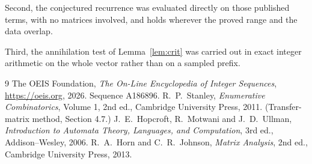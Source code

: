 \documentclass[11pt,a4paper]{article}
\theoremstyle{plain}
\theoremstyle{definition}
\begin{document}
Second, the conjectured recurrence was evaluated directly on those published terms, with no
matrices involved, and holds wherever the proved range and the data overlap.

Third, the annihilation test of Lemma~\ref{lem:crit} was carried out in exact integer
arithmetic on the whole vector rather than on a sampled prefix.

\begin{thebibliography}{9}
 The OEIS Foundation, \emph{The On-Line Encyclopedia of Integer
Sequences}, \url{https://oeis.org}, 2026. Sequence A186896.
 R.~P.~Stanley, \emph{Enumerative Combinatorics}, Volume 1, 2nd ed.,
Cambridge University Press, 2011. (Transfer-matrix method, Section 4.7.)
 J.~E.~Hopcroft, R.~Motwani and J.~D.~Ullman, \emph{Introduction to Automata
Theory, Languages, and Computation}, 3rd ed., Addison--Wesley, 2006.
 R.~A.~Horn and C.~R.~Johnson, \emph{Matrix Analysis}, 2nd ed., Cambridge
University Press, 2013.
\end{thebibliography}
\end{document}

